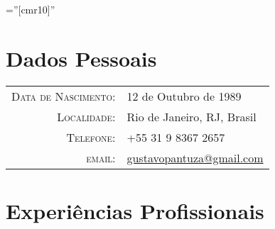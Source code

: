 \documentclass[a4paper,10pt]{article} %
\begin{document}
\pagestyle{empty} %

\font\fb=''[cmr10]'' %





\par{\bigskip\par} %

\section{Dados Pessoais}

\begin{tabular}{rl}
\textsc{Data de Nascimento:} & 12 de Outubro de 1989 \\
\textsc{Localidade:} & Rio de Janeiro, RJ, Brasil \\
\textsc{Telefone:} & +55 31 9 8367 2657\\
\textsc{email:} & \href{mailto:gustavopantuza@gmail.com}{gustavopantuza@gmail.com}
\end{tabular}





\section{Experiências Profissionais}
\end{document}
